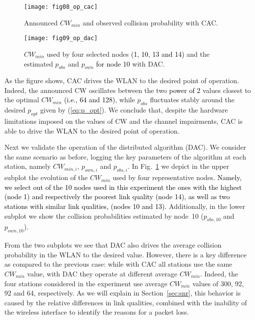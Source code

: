 \documentclass[a4paper,10pt]{article}
\newcommand{\revs}[1]{\textcolor{black}{#1}}
\begin{document}
\begin{figure}[t!]
\hspace{-0.3cm}
\begin{minipage}[b]{0.5\linewidth}
\centering
\texttt{[image: fig08\_op\_cac]}\caption{Announced $CW_{min}$ and observed collision probability with CAC.}\vspace{1.5em}
\label{fig:cac_operation}\end{minipage}
\hspace{0.5cm}
\begin{minipage}[b]{0.5\linewidth}
\centering
\texttt{[image: fig09\_op\_dac]}\caption{$CW_{min}$ used by four selected nodes \revs{(1, 10, 13 and 14)} and the estimated $p_{obs}$ and $p_{own}$ \revs{for node 10} with DAC.}\label{fig:dac_operation}\end{minipage}
\end{figure}

As the figure shows, CAC drives the WLAN to the desired point of operation. Indeed, the announced {\ttfamily CW} oscillates between the two \revs{power of 2} values closest to the optimal $CW_{min}$ \revs{(i.e., 64 and 128)}, while $p_{obs}$ fluctuates stably around the desired $p_{opt}$ given by (\ref{eq:p_opt}). We conclude that, despite the hardware limitations imposed on the values of {\ttfamily CW} and the channel impairments, CAC is able to drive the WLAN to the desired point of operation. 

Next we validate the operation of the distributed algorithm (DAC). We consider the same scenario as before, logging the key parameters of the algorithm at each station, namely $CW_{min,i}$, $p_{own,i}$ and $p_{obs,i}$. In Fig.~\ref{fig:dac_operation} we depict in the upper subplot the evolution of the $CW_{min}$ used by four representative nodes. \revs{Namely, we select out of the 10 nodes used in this experiment the ones with the highest (node 1) and respectively the poorest link quality (node 14), as well as two stations with similar link qualities, (nodes 10 and 13).} Additionally, in the lower subplot we show the collision probabilities estimated by node~10 ($p_{obs,10}$ and $p_{own,10}$). 

From the two subplots we see that DAC also drives the average collision probability in the WLAN to the desired value. However, there is a key difference as compared to the previous case: while with CAC all stations use the same $CW_{min}$ value, with DAC they operate at different average $CW_{min}$. Indeed, the four stations considered in the experiment use average $CW_{min}$ values of 300, 92, 92 and 64, respectively. As we will explain in Section~\ref{sec:snr}, this behavior is caused by the relative differences in link qualities, combined with the inability of the wireless interface to identify the reasons for a packet loss.
\end{document}
